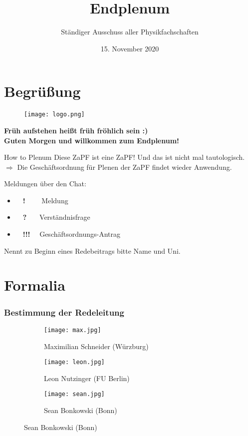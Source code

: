 \documentclass[compress, aspectratio=169]{beamer}
\title[Endplenum]{Endplenum}
\author{Ständiger Ausschuss aller Physikfachschaften}
\institute[Zusammenkunft aller Physikfachschaften]
\date{15. November 2020}
\begin{document}
\section{Begrüßung}

{
\begin{frame}
\begin{figure}
    \centering
    \texttt{[image: logo.png]}
\end{figure}
\centering
\textbf{Früh aufstehen heißt früh fröhlich sein :)\\ Guten Morgen und willkommen zum Endplenum!}
\end{frame}
}

\begin{frame}{How to Plenum}
Diese ZaPF ist eine ZaPF! Und das ist nicht mal tautologisch.\\
$\Rightarrow$ Die Geschäftsordnung für Plenen der ZaPF findet wieder Anwendung.

\vspace{.5cm}
Meldungen über den Chat:
\begin{itemize}
\item$\quad$\textbf{!}$\quad$ \ \ Meldung
\item$\quad$\textbf{?}$\quad$ \ Verständnisfrage
\item$\quad$\textbf{!!!}$\quad$ Geschäftsordnungs-Antrag
\end{itemize}
\vspace{.5cm}
Nennt zu Beginn eines Redebeitrags bitte Name und Uni.
\end{frame}

\section{Formalia}

\begin{frame}\frametitle{Bestimmung der Redeleitung}

  \begin{figure}
     \begin{subfigure}[t]{0.21\textwidth}
       \texttt{[image: max.jpg]}
       \caption*{Maximilian Schneider (Würzburg)}
     \end{subfigure}
       \begin{subfigure}[t]{0.3\textwidth}
         \texttt{[image: leon.jpg]}
         \caption*{Leon Nutzinger (FU Berlin)}
     \end{subfigure}
         \begin{subfigure}[t]{0.24\textwidth}
         \texttt{[image: sean.jpg]}
         \caption*{Sean Bonkowski (Bonn)}
     \end{subfigure}
  \end{figure}
 \end{frame}
\end{document}
